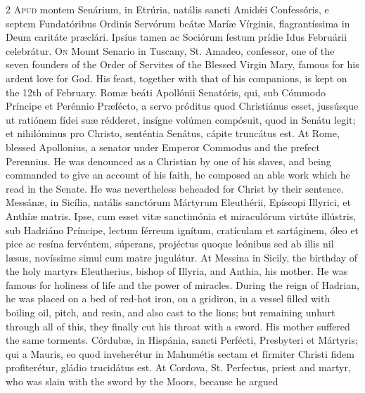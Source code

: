 \begin{paracol}{2}
\lettrine[lines=2]{A}{pud} montem Senárium, 
 in Etrúria, natális sancti Amidǽi Confessóris, e septem Fundatóribus Ordinis 
 Servórum beátæ Maríæ Vírginis, flagrantíssima in Deum caritáte præclári. 
 Ipsíus tamen ac Sociórum festum prídie Idus Februárii celebrátur.
\switchcolumn
{}
\lettrine[lines=2]{O}{n} Mount Senario in Tuscany, St. 
 Amadeo, confessor, one of the seven founders of the Order of Servites of the 
 Blessed Virgin Mary, famous for his ardent love for God. His feast, 
 together with that of his companions, is kept on the 12th of February.
\switchcolumn*
{}
Romæ beáti Apollónii 
 Senatóris, qui, sub Cómmodo Príncipe et Perénnio Præfécto, a servo próditus 
 quod Christiánus esset, jussúsque ut ratiónem fídei suæ rédderet, insígne volúmen compósuit, quod in Senátu legit; et nihilóminus pro Christo, 
 senténtia Senátus, cápite truncátus est.
\switchcolumn
{}
At Rome, blessed Apollonius, a 
 senator under Emperor Commodus and the prefect Perennius. He was 
 denounced as a Christian by one of his slaves, and being commanded to give 
 an account of his faith, he composed an able work which he read in the 
 Senate. He was nevertheless beheaded for Christ by their sentence.
\switchcolumn*
{}
Messánæ, in Sicília, 
 natális sanctórum Mártyrum Eleuthérii, Epíscopi Illyrici, et Anthíæ matris. 
 Ipse, cum esset vitæ sanctimónia et miraculórum virtúte illústris, sub 
 Hadriáno Príncipe, lectum férreum ignítum, cratículam et sartáginem, óleo et 
 pice ac resína fervéntem, súperans, projéctus quoque leónibus sed ab illis 
 nil læsus, novíssime simul cum matre jugulátur.
\switchcolumn
{}
At Messina in Sicily, the birthday 
 of the holy martyrs Eleutherius, bishop of Illyria, and Anthia, his mother. 
 He was famous for holiness of life and the power of miracles. During 
 the reign of Hadrian, he was placed on a bed of red-hot iron, on a gridiron, 
 in a vessel filled with boiling oil, pitch, and resin, and also cast to the 
 lions; but remaining unhurt through all of this, they finally cut his throat 
 with a sword. His mother suffered the same torments.
\switchcolumn*
{}
Córdubæ, in Hispánia, sancti Perfécti, Presbyteri et Mártyris; qui a Mauris, eo quod inveherétur 
 in Mahumétis sectam et fírmiter Christi fidem profiterétur, gládio 
 trucidátus est.
\switchcolumn
{}
At Cordova, St. Perfectus, priest 
 and martyr, who was slain with the sword by the Moors, because he argued 

\end{paracol}
